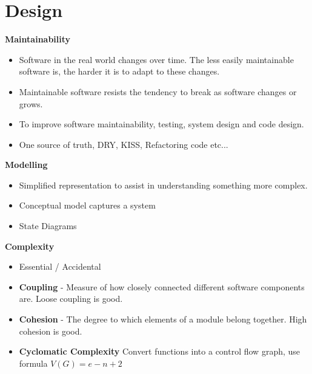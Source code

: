 \documentclass{article}
\begin{document}
\section{Design}
\textbf{Maintainability}
    \begin{itemize}
        \renewcommand\labelitemi{--}
        \item Software in the real world changes over time. The less easily maintainable software is,
the harder it is to adapt to these changes.
        \item Maintainable software resists the tendency to break as software changes or grows.
        \item To improve software maintainability, testing, system design and code design.
        \item One source of truth, DRY, KISS, Refactoring code etc...
    \end{itemize}
\textbf{Modelling}
    \begin{itemize}
        \renewcommand\labelitemi{--}
        \item Simplified representation to assist in understanding something more complex.
        \item Conceptual model captures a system
        \item State Diagrams
    \end{itemize}
\textbf{Complexity}
    \begin{itemize}
        \renewcommand\labelitemi{--}
        \item Essential / Accidental
        \item \textbf{Coupling} - Measure of how closely connected different software components are. Loose coupling is good.
        \item \textbf{Cohesion} - The degree to which elements of a module belong together. High cohesion is good.
        \item \textbf{Cyclomatic Complexity} Convert functions into a control flow graph, use formula $V(G) = e - n + 2$
    \end{itemize}
\end{document}

